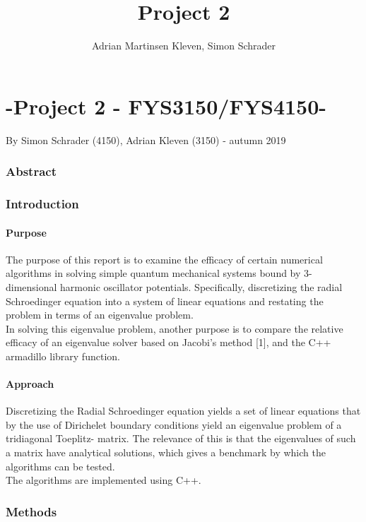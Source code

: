 \documentclass[10pt,a4paper]{article}
\author{Adrian Martinsen Kleven, Simon Schrader}
\title{Project 2}
\begin{document}
\part*{-Project 2 - FYS3150/FYS4150-
}
{\large By Simon Schrader (4150), Adrian Kleven (3150) - autumn 2019
}
\tableofcontents

\listoffigures
\listoftables

 
\clearpage
 
\section{Abstract}

\section{Introduction}
\subsection{Purpose} 
The purpose of this report is to examine the efficacy of certain numerical algorithms in solving simple quantum mechanical systems bound by 3- dimensional harmonic oscillator potentials. Specifically, discretizing the radial Schroedinger equation into a system of linear equations and restating the problem in terms of an eigenvalue problem.\\In solving this eigenvalue problem, another purpose is to compare the relative efficacy of an eigenvalue solver based on Jacobi's method [1], and the C++ armadillo library function.
\subsection{Approach}
Discretizing the Radial Schroedinger equation yields a set of linear equations that by the use of Dirichelet boundary conditions yield an eigenvalue problem of a tridiagonal Toeplitz- matrix. The relevance of this is that the eigenvalues of such a matrix have analytical solutions, which gives a benchmark by which the algorithms can be tested.\\The algorithms are implemented using C++.
\section{Methods}
\end{document}
